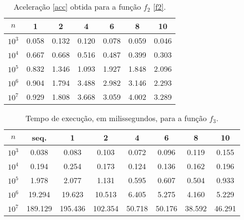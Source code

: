 \documentclass{article}
\begin{document}
        \begin{table}[h!]
          \centering
          \begin{tabular}{||c c c c c c c||}
            \hline
            $n$ & 1 & 2 & 4 & 6 & 8 & 10 \\ 
            \hline \hline
            $10^{3}$ & 0.058 & 0.132 & 0.120 & 0.078 & 0.059 & 0.046 \\ 
            \hline 
            $10^{4}$ & 0.667 & 0.668 & 0.516 & 0.487 & 0.399 & 0.303 \\ 
            \hline 
            $10^{5}$ & 0.832 & 1.346 & 1.093 & 1.927 & 1.848 & 2.096 \\ 
            \hline 
            $10^{6}$ & 0.904 & 1.794 & 3.488 & 2.982 & 3.146 & 2.293 \\ 
            \hline 
            $10^{7}$ & 0.929 & 1.808 & 3.668 & 3.059 & 4.002 & 3.289 \\ 
            \hline 
          \end{tabular}
          \caption{Aceleração \eqref{acc} obtida para a função $f_2$ \eqref{f2}. }
          \label{f2a}
        \end{table}

        \begin{table}[h!]
          \centering
          \begin{tabular}{||c c c c c c c c||}
            \hline
            $n$ & seq. & 1 & 2 & 4 & 6 & 8 & 10 \\ 
            \hline \hline
            $10^{3}$ & 0.038 & 0.083 & 0.103 & 0.072 & 0.096 & 0.119 & 0.155 \\ 
            \hline 
            $10^{4}$ & 0.194 & 0.254 & 0.173 & 0.124 & 0.136 & 0.162 & 0.196 \\ 
            \hline 
            $10^{5}$ & 1.978 & 2.077 & 1.131 & 0.595 & 0.607 & 0.504 & 0.933 \\ 
            \hline 
            $10^{6}$ & 19.294 & 19.623 & 10.513 & 6.405 & 5.275 & 4.160 & 5.229 \\ 
            \hline 
            $10^{7}$ & 189.129 & 195.436 & 102.354 & 50.718 & 50.176 & 38.592 & 46.291 \\ 
            \hline 
          \end{tabular}
          \caption{Tempo de execução, em milissegundos, para a função $f_3$.}
          \label{f3t}
        \end{table}
      
\end{document}
